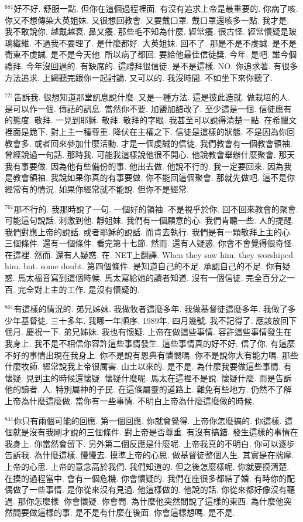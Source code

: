 \documentclass{book}
\begin{document}
$^{681}$好不好.
舒服一點.
但你在這個過程裡面.
有沒有追求上帝是最重要的.
你病了咳.
你又不想傳染大英姐妹.
又很想回教會.
又要戴口罩.
戴口罩還咳多一點.
我才是.
我不敢說你.
越戴越衰.
鼻又癢.
那些毛不知為什麼.
經常癢.
很古怪.
經常懷疑是玻璃纖維.
不過我不要理了.
是什麼都好.
大英姐妹.
回不了.
那是不是不虔誠.
是不是衛東不虔誠.
是不是今天他.
所以病了都回.
要給他最佳信徒獎.
今年.
是吧.
誰今個禮拜.
今年沒回過的.
有缺席的.
這禮拜很信徒.
是不是這樣.
NO.
你追求著.
有很多方法追求.
上網聽完跟你一起討論.
又可以的.
我沒時間.
不如坐下來你聽了.

$^{721}$告訴我.
很想知道那堂訊息說什麼.
又是一種方法.
這是彼此造就.
做栽培的人.
是可以作一個.
傳話的訊息.
當然你不要.
加鹽加醋改了.
至少這是一個.
信徒應有的態度.
敬拜.
一見到耶穌.
敬拜.
敬拜的字眼.
我甚至可以說得清楚一點.
在希臘文裡面是跪下.
對上主一種尊重.
降伏在主權之下.
信徒是這樣的狀態.
不是因為你回教會多.
或者回來參加什麼活動.
才是一個虔誠的信徒.
我們教會有一個教會領袖.
曾經說過一句話.
那時我.
可能我這樣說他很不開心.
他說教會舉辦什麼聚會.
那天我有事要做.
因為他有些備份的事.
他出去做.
他說不行的.
我一定要回來.
因為我是教會領袖.
我說如果你真的有事要做.
你不能回這個聚會.
那就先做吧.
這不是你經常有的情況.
如果你經常就不能說.
但你不是經常.

$^{761}$那不行的.
我那時說了一句.
一個好的領袖.
不是視乎於你.
回不回來教會的聚會.
可能這句說話.
刺激到他.
靜姐妹.
我們有一個願意的心.
我們肯聽一些.
人的提醒.
我們對應上帝的說話.
或者耶穌的說話.
而肯去執行.
我們是有一顆敬拜上主的心.
三個條件.
還有一個條件.
看完第十七節.
然而.
還有人疑惑.
你會不會覺得很奇怪.
在這裡.
然而.
還有人疑惑.
在.
NET上翻譯.
When they saw him.
they worshiped him.
but.
some doubt.
第四個條件.
是知道自己的不足.
承認自己的不足.
你有疑惑.
馬太福音寫到這個時候.
馬太寫給她的讀者知道.
沒有一個信徒.
完全百分之一百.
完全對上主的工作.
是沒有懷疑的.

$^{801}$有這樣的情況的.
弟兄姊妹.
我做牧者這麼多年.
我做基督徒這麼多年.
我做了多少年基督徒.
三十多年.
我哪一年順序.
1989年.
四月幾號.
我不記得了.
應該放回下個月.
慶祝一下.
弟兄姊妹.
我也有懷疑.
上帝在做這些事情.
容許這些事情發生在我身上.
我不是不相信你容許這些事情發生.
這些事情真的好不好.
信了你.
有這麼不好的事情出現在我身上.
你不是說有恩典有憐憫嗎.
你不是說你大有能力嗎.
那些什麼牧師.
經常說我上帝很厲害.
山土以來的.
是不是.
為什麼我要做這些事情.
有懷疑.
見到主的時候還懷疑.
懷疑什麼呢.
馬太在這裡不是說.
懷疑什麼.
而是告訴他的讀者.
人.
特別屬神的子民.
在這條屬靈的道路上.
難免有些地方.
仍然不了解上帝為什麼這麼做.
當你有一些事情.
不明白上帝為什麼這麼做的時候.

$^{841}$你只有兩個可能的回應.
第一個回應.
你就會覺得.
上帝你怎麼搞的.
你這樣.
這個就是沒有我剛才說的三個條件.
對上帝是否尊重.
有沒有搞錯.
發生這樣的事情在我身上.
你當然會留下.
另外第二個反應是什麼呢.
上帝我真的不明白.
你可以逐步告訴我.
為什麼這樣.
慢慢去.
摸準上帝的心思.
做基督徒整個人生.
其實是在揣摩.
上帝的心思.
上帝的意念高於我們.
我們知道的.
但之後怎麼樣呢.
你就要摸清楚.
在摸的過程當中.
會有一個危機.
你會懷疑的.
我們在座很多都結了婚.
有時你的配偶做了一些事情.
是你從來沒有見過.
他這樣做的.
他說的話.
你從來都好像沒有聽過.
那你怎麼樣.
你會懷疑.
你會問.
為什麼他突然間說了這樣的東西.
為什麼他突然間要做這樣的事.
是不是有什麼在後面.
你會這樣想嗎.
是不是.
\end{document}
